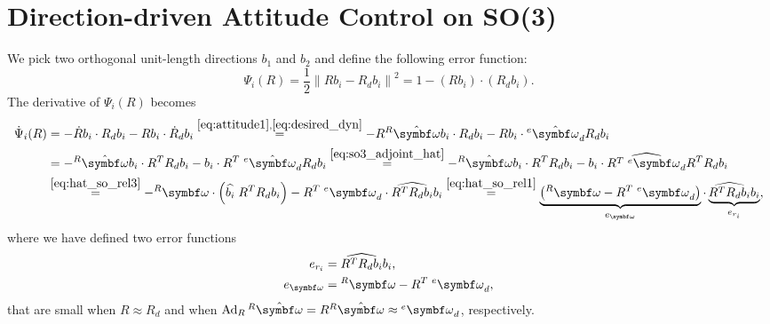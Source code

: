 \section{Direction-driven Attitude Control on SO(3)}

We pick two orthogonal unit-length directions $b_1$ and $b_2$ and define the following error function:
\begin{equation}
  \Psi_i(R) = \frac{1}{2} \left\| R b_i - R_d b_i \right\|^2 = 1 - (R b_i) \cdot (R_d b_i).
\end{equation}
The derivative of $\Psi_i(R)$ becomes
\begin{equation}
  \label{eq:dot_psi}
  \begin{aligned}
    \dot \Psi_i(R) & = -\dot R b_i \cdot R_d b_i - R b_i \cdot \dot R_d b_i \overset{\eqref{eq:attitude1}, \eqref{eq:desired_dyn}}{=} -R {^R{\hat \bomega}} b_i \cdot R_d b_i - R b_i \cdot {^e\hat \bomega_d} R_d b_i                                                                                                                                   \\
                   & = - {^R{\hat \bomega}} b_i \cdot R^T R_d b_i - b_i \cdot R^T \; {^e\hat \bomega_d} R_d b_i \overset{\eqref{eq:so3_adjoint_hat}}{=} - {^R{\hat \bomega}} b_i \cdot R^T R_d b_i - b_i \cdot  \widehat{R^T \; {^e\bomega_d}} R^TR_d b_i                                                                                                \\
                   & \overset{\eqref{eq:hat_so_rel3}}{=} -{^R{\bomega}} \cdot \left( \widehat{b_i} \; R^T R_d b_i \right) - R^T \; {^e\bomega_d} \cdot \widehat{R^TR_d b_i} b_i \overset{\eqref{eq:hat_so_rel1}}{=} \underbrace{\left( {^R{ \bomega}} - R^T \; {^e\bomega_d} \right)}_{e_\bomega} \cdot \underbrace{\widehat{R^TR_d b_i} b_i}_{e_{r_i}},
  \end{aligned}
\end{equation}
where we have defined two error functions
\begin{subequations}
  \begin{align}
    \label{eq:e_ri} e_{r_i}      & = \widehat{R^TR_d b_i} b_i,           \\
    \label{eq:e_omega} e_\bomega & = {^R\bomega} - R^T \; {^e\bomega_d},
  \end{align}
\end{subequations}
that are small when $R \approx R_d$ and when $\Ad_R {^R{\hat \bomega}} = R {^R{\hat \bomega}} \approx {^e\bomega_d}$, respectively.

